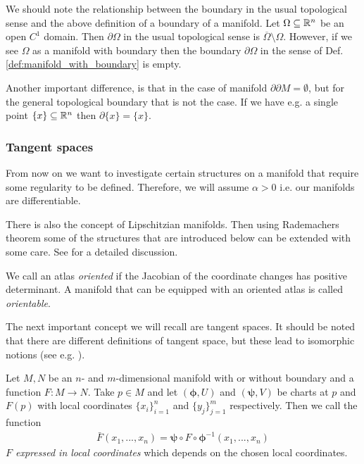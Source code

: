 \documentclass[../master_thesis.tex]{subfiles}
\begin{document}
\begin{remark}
    We should note the relationship between the boundary in the usual topological sense 
    and the above definition of a boundary of a manifold. Let $\Omega \subseteq \mathbb{R}^n$ be 
    an open $C^1$ domain. Then $\partial \Omega$ in the usual topological sense 
    is $\overline{\Omega} \setminus \Omega$. However, if we see $\Omega$ 
    as a manifold with boundary then the boundary $\partial \Omega$ in the sense of 
    Def. \ref{def:manifold_with_boundary} is empty. 

    Another important difference, is that in the case of manifold $\partial \partial M = \emptyset$,
    but for the general topological boundary that is not the case. If we have e.g. a single 
    point $\{ x \} \subseteq \mathbb{R}^n$ then $\partial \{x \} = \{ x \}$.   
\end{remark}

\subsubsection{Tangent spaces}\label{sec:tangent_spaces}

From now on we want to investigate certain structures on a manifold 
that require some regularity to be defined. Therefore, 
we will assume $\alpha > 0$ i.e. our manifolds are 
differentiable.

\begin{remark}
    There is also the concept of Lipschitzian manifolds. Then using Rademachers 
    theorem some of the structures that are introduced below can be extended 
    with some care. See \cite{lipschitz_manifolds} for a detailed discussion.
\end{remark}

\begin{definition}
    We call an atlas \textit{oriented} if the Jacobian of the coordinate
    changes has positive determinant. A manifold that can be equipped with 
    an oriented atlas is called \textit{orientable}.
\end{definition}


The next important concept we will recall are tangent spaces. 
It should be noted that there are different definitions of tangent space, but
these lead to isomorphic notions 
(see e.g. \cite[Sec.\,1.B]{riemannian_geometry}).

\begin{definition}
    Let $M, N$ be an $n$- and $m$-dimensional manifold with or without boundary 
    and a function $F: M \rightarrow N$. Take $p \in M$ and let $(\boldsymbol{\phi}, U)$ 
    and $(\boldsymbol{\psi},V)$ be charts at $p$ and $F(p)$ with local 
    coordinates $\{x_i\}_{i=1}^n$ and $\{y_j\}_{j=1}^m$ respectively. 
    Then we call the function 
    \begin{align*}
        \bar{F} (x_1,...,x_n) = \boldsymbol{\psi} \circ F \circ \boldsymbol{\phi}^{-1}(x_1,...,x_n)        
    \end{align*}
    \textit{$F$ expressed in local coordinates} which depends
    on the chosen local coordinates.
\end{definition}
\end{document}
